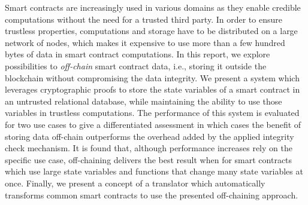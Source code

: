 Smart contracts are increasingly used in various domains as they enable credible computations without the need for a trusted third party.
In order to ensure trustless properties, computations and storage have to be distributed on a large network of nodes, which makes it expensive to use more than a few hundred bytes of data in smart contract computations.
In this report, we explore possibilities to \emph{off-chain} smart contract data, i.e., storing it outside the blockchain without compromising the data integrity.
We present a system which leverages cryptographic proofs to store the state variables of a smart contract in an untrusted relational database, while maintaining the ability to use those variables in trustless computations.
The performance of this system is evaluated for two use cases to give a differentiated assessment in which cases the benefit of storing data off-chain outperforms the overhead added by the applied integrity check mechanism.
It is found that, although performance increases rely on the specific use case, off-chaining delivers the best result when for smart contracts which use large state variables and functions that change many state variables at once.
Finally, we present a concept of a translator which automatically transforms common smart contracts to use the presented off-chaining approach.
